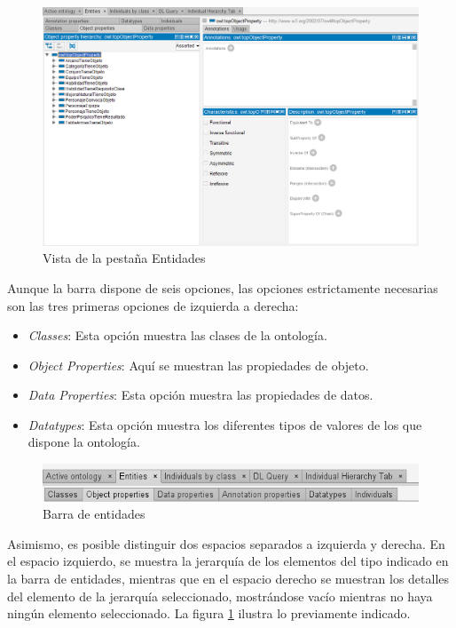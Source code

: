 \begin{figure}[H]
    \centering
    \includegraphics[scale=0.4]{Figures/Protege/Entities_workspace.png}
    \caption{Vista de la pestaña Entidades}
    \label{Entities_workspace}
\end{figure}

Aunque la barra dispone de seis opciones, las opciones estrictamente necesarias son las tres primeras 
opciones de izquierda a derecha:
\begin{itemize}
    \item \textit{Classes}: Esta opción muestra las clases de la ontología.
    \item \textit{Object Properties}: Aquí se muestran las propiedades de objeto. 
    \item \textit{Data Properties}: Esta opción muestra las propiedades de datos.
    \item \textit{Datatypes}: Esta opción muestra los diferentes tipos de valores de los que dispone la ontología.
\end{itemize}

\begin{figure}[H]
    \centering
    \includegraphics[scale=0.8]{Figures/Protege/Entities_bar.png}
    \caption{Barra de entidades}
    \label{Entities_bar}
\end{figure}


Asimismo, es posible distinguir dos espacios separados a izquierda y derecha. En el espacio izquierdo, se muestra 
la jerarquía de los elementos del tipo indicado en la barra de entidades, mientras que en el espacio derecho 
se muestran los detalles del elemento de la jerarquía seleccionado, mostrándose vacío mientras no haya ningún 
elemento seleccionado. La figura \ref*{Entities_workspace} ilustra lo previamente indicado. \medskip

